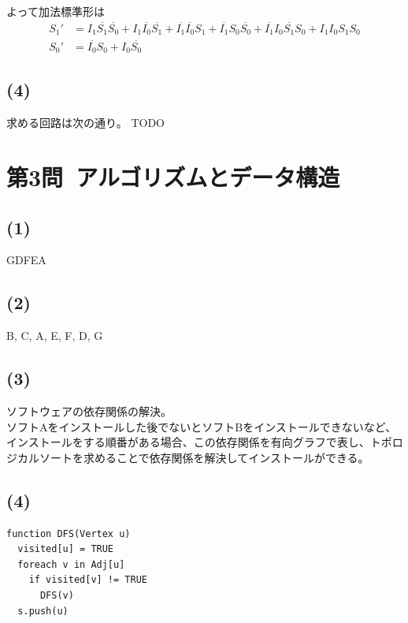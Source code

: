 \documentclass[a4paper,12pt,xelatex,ja=standard]{bxjsarticle}
\begin{document}
よって加法標準形は
\begin{equation*}
  \begin{split}
    S_1'
      &= I_1 \overline{S_1} \overline{S_0} + I_1 \overline{I_0} \overline{S_1} + \overline{I_1} \overline{I_0} S_1 + \overline{I_1} S_0 \overline{S_0} + \overline{I_1}I_0 \overline{S_1}S_0 + I_1 I_0 S_1 S_0 \\
    S_0'
      &= \overline{I_0}S_0 + I_0 \overline{S_0}
  \end{split}
\end{equation*}

\subsection*{(4)}
求める回路は次の通り。
TODO

\section*{第3問\ アルゴリズムとデータ構造}
\subsection*{(1)}
GDFEA

\subsection*{(2)}
B, C, A, E, F, D, G

\subsection*{(3)}
ソフトウェアの依存関係の解決。\\
ソフトAをインストールした後でないとソフトBをインストールできないなど、インストールをする順番がある場合、この依存関係を有向グラフで表し、トポロジカルソートを求めることで依存関係を解決してインストールができる。

\subsection*{(4)}
\begin{lstlisting}[caption=DFSの擬似コード]
function DFS(Vertex u)
  visited[u] = TRUE
  foreach v in Adj[u]
    if visited[v] != TRUE
      DFS(v)
  s.push(u)
\end{lstlisting}
\end{document}
